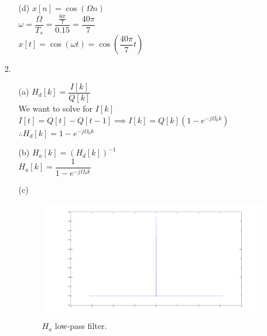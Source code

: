 \documentclass{article}
\begin{document}
\begin{enumerate}
\begin{enumerate}
\bigskip

	\item[(d)]
		$x[n] = \cos\left(\Omega n\right)$\\
		
		$\omega = \dfrac{\Omega}{T_{s}} = \dfrac{\frac{6\pi}{7}}{0.15} = \dfrac{40\pi}{7}$\\
		
		$x[t] = \cos\left(\omega t\right) = \cos\left(\dfrac{40\pi}{7} t\right) $
	\end{enumerate}

\newpage

\item[2.]
	\begin{enumerate}
	\item[(a)]
		$H_d[k] = \dfrac{I[k]}{Q[k]}$\\
		
		We want to solve for $I[k]$\\
		
		$I[t] = Q[t] - Q[t-1] \implies I[k] = Q[k] \left(1 - e^{-j\Omega_0k}\right)$\\
		
		$\therefore H_d[k] = 1 - e^{-j\Omega_0k}$\\

\bigskip

	\item[(b)]
		$H_a[k] = \left(H_d[k]\right)^{-1}$\\
		
		$H_a[k] = \dfrac{1}{1 - e^{-j\Omega_0k}}$

\bigskip

	\item [(c)] $\:$ \\
		\begin{figure}[!htb]
		\minipage{\textwidth}
			  \includegraphics[width=\linewidth]{../images/Problem3Graph.png}
		  \caption{$H_a$ low-pass filter.}
		\endminipage\hfill
		\end{figure}


\end{enumerate}
\end{enumerate}
\end{document}
